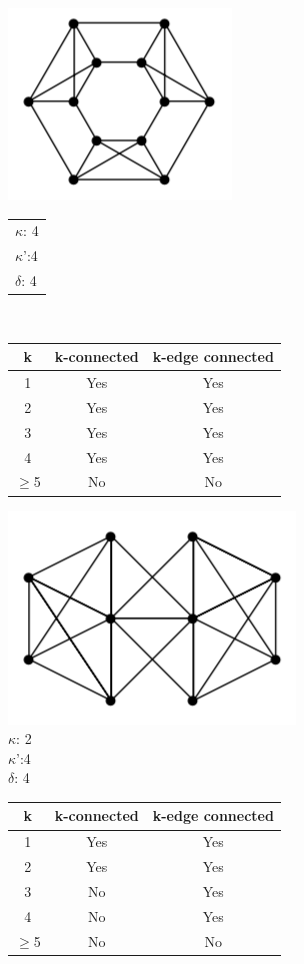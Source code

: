 \documentclass[12pt]{article}
\begin{document}
\begin{center}
\includegraphics[scale=.65]{hexagon}

\begin{tabular}{l}
$\kappa$: 4 \\
$\kappa$':4 \\
$\delta$: 4 \\

\end{tabular} \\
\begin{tabular}{|c|c|c|}\hline
k & k-connected & k-edge connected \\ \hline
1 & Yes & Yes \\ \hline
2 & Yes & Yes \\ \hline
3 & Yes & Yes \\ \hline
4 & Yes & Yes \\ \hline
$\geq$5 & No & No \\ \hline
\end{tabular}



\clearpage
\includegraphics[scale=.65]{bigOne}\\

$\kappa$: 2 \\
$\kappa$':4 \\
$\delta$: 4 \\

\begin{tabular}{|c|c|c|}\hline
k & k-connected & k-edge connected \\ \hline
1 & Yes & Yes \\ \hline
2 & Yes & Yes \\ \hline
3 & No & Yes \\ \hline
4 & No & Yes \\ \hline
$\geq$5 & No & No \\ \hline
\end{tabular}


\end{center}
\end{document}

